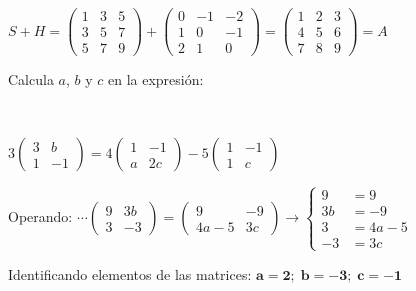 \begin{proofw}
$ S+H= \left( \begin{matrix} 1&3&5 \\3&5&7\\5&7&9 \end{matrix} \right)  + \left( \begin{matrix} 0&-1&-2 \\1&0&-1\\2&1&0 \end{matrix} \right) =  \left( \begin{matrix} 1&2&3 \\4&5&6\\7&8&9 \end{matrix} \right) =A$
	
\end{proofw}


\begin{ejre}
Calcula $a$, $b$ y $c$ en la expresión:

$\quad$

$3\left( \begin{matrix} 3&b\\1&-1  \end{matrix} \right)=4\left( \begin{matrix}  1&-1\\a&2c \end{matrix} \right)-5\left( \begin{matrix} 1&-1\\1&c  \end{matrix} \right)$	
\end{ejre}
\begin{proofw}\renewcommand{\qedsymbol}{$\diamond$}
Operando: $\cdots \left( \begin{matrix} 9&3b\\3&-3  \end{matrix} \right)=\left( \begin{matrix} 9&-9\\4a-5&3c  \end{matrix} \right) \to \begin{cases} 9&=9\\ 3b&=-9 \\ 3&=4a-5\\ -3&=3c      \end{cases}$	

\noindent Identificando elementos de las matrices: $\boldsymbol{a=2;\; b=-3;\; c=-1}$
\end{proofw}



